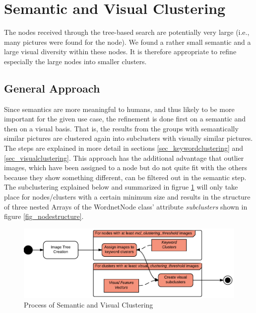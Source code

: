 %
\section{Semantic and Visual Clustering}
\label{sec_inhalt}

The nodes received through the tree-based search are potentially very large (i.e., many pictures were found for the node). We found a rather small semantic and a large visual diversity within these nodes. It is therefore appropriate to refine especially the large nodes into smaller clusters.

\subsection{General Approach}
Since semantics are more meaningful to humans, and thus likely to be more important for the given use case, the refinement is done first on a semantic and then on a visual basis. That is, the results from the groups with semantically similar pictures are clustered again into subclusters with visually similar pictures. The steps are explained in more detail in sections \ref{sec_keywordclustering} and \ref{sec_visualclustering}.
This approach has the additional advantage that outlier images, which have been assigned to a node but do not quite fit with the others because they show something different, can be filtered out in the semantic step. \\
The subclustering explained below and summarized in figrue \ref{fig_semanticandvisual} will only take place for nodes/clusters with a certain minimum size and results in the structure of three nested Arrays of the WordnetNode class' attribute \emph{subclusters} shown in figure \ref{fig_nodestructure}.

\begin{figure}[h]
\centering
\includegraphics[width=\textwidth]{images/semantic_and_visual_clustering.pdf}
\caption{Process of Semantic and Visual Clustering}
\label{fig_semanticandvisual}
\end{figure}

